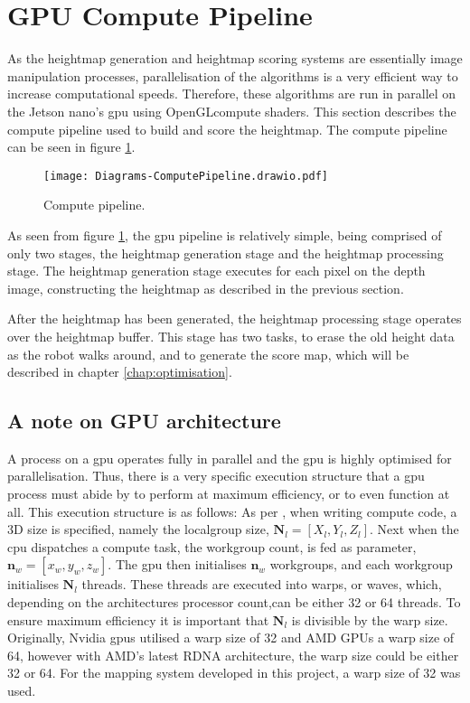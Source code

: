     \section{GPU Compute Pipeline}
        As the heightmap generation and heightmap scoring systems are essentially image manipulation processes, parallelisation of the algorithms is a very efficient way to increase computational speeds. Therefore, these algorithms are run in parallel on the Jetson nano's \ac{gpu} using OpenGLcompute shaders. This section describes the compute pipeline used to build and score the heightmap. The compute pipeline can be seen in figure \ref{fig:compute_pipe}.
        \begin{figure}[h]
            \centering
            \texttt{[image: Diagrams-ComputePipeline.drawio.pdf]}
            \caption{Compute pipeline.}
            \label{fig:compute_pipe}
        \end{figure}
    
        \noindent
        As seen from figure \ref{fig:compute_pipe}, the \ac{gpu} pipeline is relatively simple, being comprised of only two stages, the heightmap generation stage and the heightmap processing stage. The heightmap generation stage executes for each pixel on the depth image, constructing the heightmap as described in the previous section.
        
        After the heightmap has been generated, the heightmap processing stage operates over the heightmap buffer. This stage has two tasks, to erase the old height data as the robot walks around, and to generate the score map, which will be described in chapter \ref{chap:optimisation}.
        
        \newpage
        \subsection{A note on GPU architecture}
            A process on a \ac{gpu} operates fully in parallel and the \ac{gpu} is highly optimised for parallelisation. Thus, there is a very specific execution structure that a \ac{gpu} process must abide by to perform at maximum efficiency, or to even function at all. This execution structure is as follows: As per \cite{nvidia_doc}, when writing compute code, a 3D size is specified, namely the localgroup size, \(\bm{N}_{l} = [X_l,Y_{l},Z_{l}]\). Next when the \ac{cpu} dispatches a compute task, the workgroup count, is fed as parameter, \(\bm{n}_{w} = [x_{w},y_{w},z_{w}]\). The \ac{gpu} then initialises \(\bm{n}_w\) workgroups, and each workgroup initialises \(\bm{N}_l\) threads. These threads are executed into warps, or waves, which, depending on the architectures processor count,can be either 32 or 64 threads. To ensure maximum efficiency it is important that \(\bm{N}_l\) is divisible by the warp size.
            Originally, Nvidia \ac{gpu}s utilised a warp size of 32 and AMD GPUs a warp size of 64, however with AMD's latest RDNA architecture, the warp size could be either 32 or 64. For the mapping system developed in this project, a warp size of 32 was used.
            
